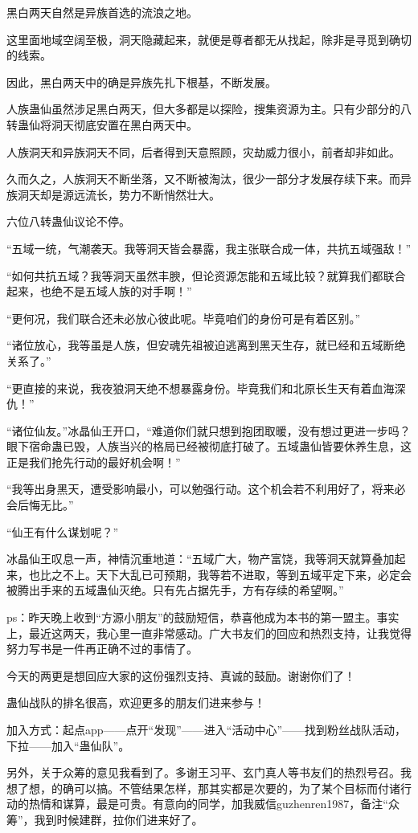 \begin{this_body}
黑白两天自然是异族首选的流浪之地。

这里面地域空阔至极，洞天隐藏起来，就便是尊者都无从找起，除非是寻觅到确切的线索。

因此，黑白两天中的确是异族先扎下根基，不断发展。

人族蛊仙虽然涉足黑白两天，但大多都是以探险，搜集资源为主。只有少部分的八转蛊仙将洞天彻底安置在黑白两天中。

人族洞天和异族洞天不同，后者得到天意照顾，灾劫威力很小，前者却非如此。

久而久之，人族洞天不断坐落，又不断被淘汰，很少一部分才发展存续下来。而异族洞天却是源远流长，势力不断悄然壮大。

六位八转蛊仙议论不停。

“五域一统，气潮袭天。我等洞天皆会暴露，我主张联合成一体，共抗五域强敌！”

“如何共抗五域？我等洞天虽然丰腴，但论资源怎能和五域比较？就算我们都联合起来，也绝不是五域人族的对手啊！”

“更何况，我们联合还未必放心彼此呢。毕竟咱们的身份可是有着区别。”

“诸位放心，我等虽是人族，但安魂先祖被迫逃离到黑天生存，就已经和五域断绝关系了。”

“更直接的来说，我夜狼洞天绝不想暴露身份。毕竟我们和北原长生天有着血海深仇！”

“诸位仙友。”冰晶仙王开口，“难道你们就只想到抱团取暖，没有想过更进一步吗？眼下宿命蛊已毁，人族当兴的格局已经被彻底打破了。五域蛊仙皆要休养生息，这正是我们抢先行动的最好机会啊！”

“我等出身黑天，遭受影响最小，可以勉强行动。这个机会若不利用好了，将来必会后悔无比。”

“仙王有什么谋划呢？”

冰晶仙王叹息一声，神情沉重地道：“五域广大，物产富饶，我等洞天就算叠加起来，也比之不上。天下大乱已可预期，我等若不进取，等到五域平定下来，必定会被腾出手来的五域蛊仙灭绝。只有先占据先手，方有存续的希望啊。”

ps：昨天晚上收到“方源小朋友”的鼓励短信，恭喜他成为本书的第一盟主。事实上，最近这两天，我心里一直非常感动。广大书友们的回应和热烈支持，让我觉得努力写书是一件再正确不过的事情了。

今天的两更是想回应大家的这份强烈支持、真诚的鼓励。谢谢你们了！

蛊仙战队的排名很高，欢迎更多的朋友们进来参与！

加入方式：起点app——点开“发现”——进入“活动中心”——找到粉丝战队活动，下拉——加入“蛊仙队”。

另外，关于众筹的意见我看到了。多谢王习平、玄门真人等书友们的热烈号召。我想了想，的确可以搞。不管结果怎样，那其实都是次要的，为了某个目标而付诸行动的热情和谋算，最是可贵。有意向的同学，加我威信guzhenren1987，备注“众筹”，我到时候建群，拉你们进来好了。

\end{this_body}

